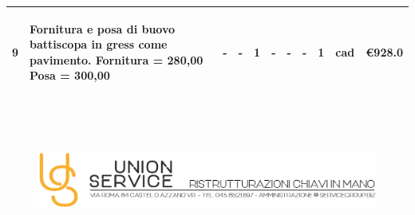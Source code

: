 \documentclass[a4paper]{article}
\begin{document}
\begin{tabular}{ | L{6.1mm} |  L{26mm} | L{11mm} |  L{9mm} | L{6.5mm} | L{6.5mm} | L{6.5mm} | L{6.5mm} | L{8mm} | L{7.7mm} | L{16mm} |  }
                        \vspace{2.5mm}\begin{spacing}{0}9\end{spacing} &\vspace{2.5mm}\begin{spacing}{0}Fornitura e posa di buovo battiscopa in gress come pavimento. Fornitura = 280,00 Posa = 300,00\end{spacing} &\vspace{2.5mm}\begin{spacing}{0}-\end{spacing} &\vspace{2.5mm}\begin{spacing}{0}-\end{spacing} &\vspace{2.5mm}\begin{spacing}{0}1\end{spacing} &\vspace{2.5mm}\begin{spacing}{0}-\end{spacing} &\vspace{2.5mm}\begin{spacing}{0}-\end{spacing} &\vspace{2.5mm}\begin{spacing}{0}-\end{spacing} &\vspace{2.5mm}\begin{spacing}{0}1\end{spacing} &\vspace{2.5mm}\begin{spacing}{0}cad\end{spacing} &\vspace{2.5mm}\begin{spacing}{0}\euro\hfill  928.0
                        \end{spacing} \\ \hline %

                        \end{tabular} \\ \newpage
                                \begin{figure}[!t]
                                \includegraphics[width=15.8cm, height=3cm]{intestazioneAlta2.jpg}
                                \end{figure}
                                
\end{document}
